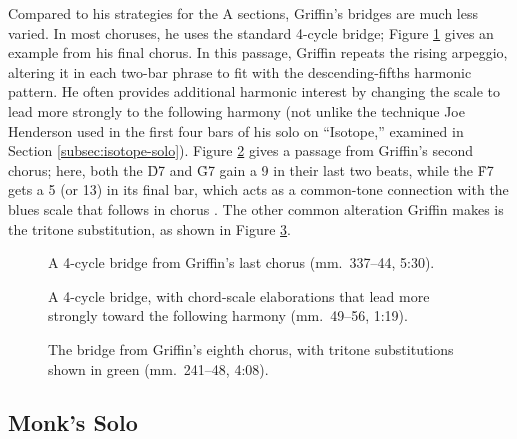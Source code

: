 Compared to his strategies for the A sections, Griffin's bridges are
much less varied. In most choruses, he uses the standard 4-cycle bridge;
Figure \ref{ran:jg-standard-bridge} gives an example from his final chorus. In
this passage, Griffin repeats the rising arpeggio, altering it in each two-bar
phrase to fit with the descending-fifths harmonic pattern. He often
provides additional harmonic interest by changing the scale to lead more
strongly to the following harmony (not unlike the technique Joe Henderson used
in the first four bars of his solo on ``Isotope,'' examined in Section
\ref{subsec:isotope-solo}). Figure \ref{ran:jg-bridge-altered} gives a passage
from Griffin's second chorus; here, both the \h{D7} and \h{G7} gain a \flat{}9
in their last two beats, while the \h{F7} gets a \sharp{}5 (or \flat{}13) in
its final bar, which acts as a common-tone connection with the \Bflat blues
scale that follows in chorus . The other common alteration Griffin
makes is the tritone substitution, as shown in Figure
\ref{ran:jg-bridge-tritones}.


\begin{figure}[tbp]
  \caption[A 4-cycle bridge from Griffin's last chorus.]{%
    A 4-cycle bridge from Griffin's last chorus (mm.~337--44, 5:30).}
  \label{ran:jg-standard-bridge}
\end{figure}

\begin{figure}[tbp]
  \caption[A 4-cycle bridge, with chord-scale elaborations that lead
  more strongly toward the following harmony.]{%
    A 4-cycle bridge, with chord-scale elaborations that lead more
    strongly toward the following harmony (mm.~49--56, 1:19).}
  \label{ran:jg-bridge-altered}
\end{figure}

\begin{figure}[tbp]
  \caption[The bridge from Griffin's eighth chorus, with tritone
  substitutions.]{%
    The bridge from Griffin's eighth chorus, with tritone substitutions shown
    in green (mm.~241--48, 4:08).}
  \label{ran:jg-bridge-tritones}
\end{figure}

\FloatBarrier
\subsection{Monk’s Solo}


